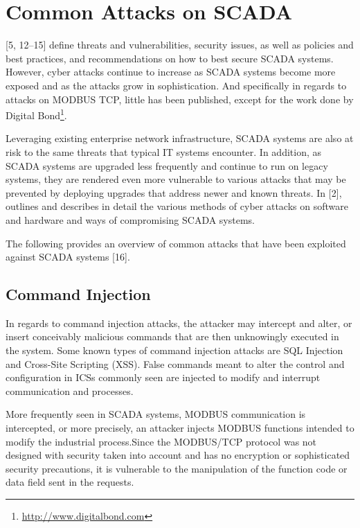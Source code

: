 \documentclass[12pt,]{article}
\let\rmarkdownfootnote\footnote%
\def\footnote{\protect\rmarkdownfootnote}
\begin{document}
\pagebreak

\section{Common Attacks on SCADA}\label{common-attacks-on-scada}

{[}5, 12--15{]} define threats and vulnerabilities, security issues, as
well as policies and best practices, and recommendations on how to best
secure SCADA systems. However, cyber attacks continue to increase as
SCADA systems become more exposed and as the attacks grow in
sophistication. And specifically in regards to attacks on MODBUS TCP,
little has been published, except for the work done by Digital
Bond\footnote{\url{http://www.digitalbond.com}}.

Leveraging existing enterprise network infrastructure, SCADA systems are
also at risk to the same threats that typical IT systems encounter. In
addition, as SCADA systems are upgraded less frequently and continue to
run on legacy systems, they are rendered even more vulnerable to various
attacks that may be prevented by deploying upgrades that address newer
and known threats. In {[}2{]}, outlines and describes in detail the
various methods of cyber attacks on software and hardware and ways of
compromising SCADA systems.

The following provides an overview of common attacks that have been
exploited against SCADA systems {[}16{]}.

\subsection{Command Injection}\label{command-injection}

In regards to command injection attacks, the attacker may intercept and
alter, or insert conceivably malicious commands that are then
unknowingly executed in the system. Some known types of command
injection attacks are SQL Injection and Cross-Site Scripting (XSS).
False commands meant to alter the control and configuration in ICSs
commonly seen are injected to modify and interrupt communication and
processes.

More frequently seen in SCADA systems, MODBUS communication is
intercepted, or more precisely, an attacker injects MODBUS functions
intended to modify the industrial process.Since the MODBUS/TCP protocol
was not designed with security taken into account and has no encryption
or sophisticated security precautions, it is vulnerable to the
manipulation of the function code or data field sent in the requests.
\end{document}
